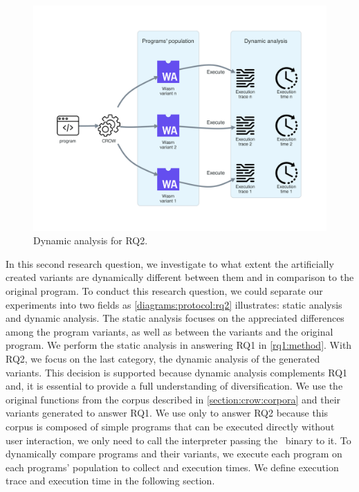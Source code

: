 
\section{\rqtwo}
\label{rq2:method}


\begin{figure}[h]
    \centering
    \includegraphics[width=\linewidth]{diagrams/Rq2.pdf}
    \caption{Dynamic analysis for RQ2.}
    \label{diagrams:protocol:rq2}
\end{figure}

In this second research question, we investigate to what extent the artificially created variants are dynamically different between them and in comparison to the original program. To conduct this research question, we could separate our experiments into two fields as \autoref{diagrams:protocol:rq2} illustrates: static analysis and dynamic analysis. 
The static analysis focuses on the appreciated differences among the program variants, as well as between the variants and the original program. We perform the static analysis in answering RQ1 in \autoref{rq1:method}. 
With RQ2, we focus on the last category, the dynamic analysis of the generated variants. This decision is supported because dynamic analysis complements RQ1 and, it is essential to provide a full understanding of diversification.
We use the original functions from the \corpusrosetta corpus described in \autoref{section:crow:corpora} and their variants generated to answer RQ1. 
We use only \corpusrosetta to answer RQ2 because this corpus is composed of simple programs that can be executed directly without user interaction, \ie we only need to call the interpreter passing the \wasm\ binary to it. 
To dynamically compare programs and their variants, we execute each program on each programs' population to collect and execution times. We define execution trace and execution time in the following section.

